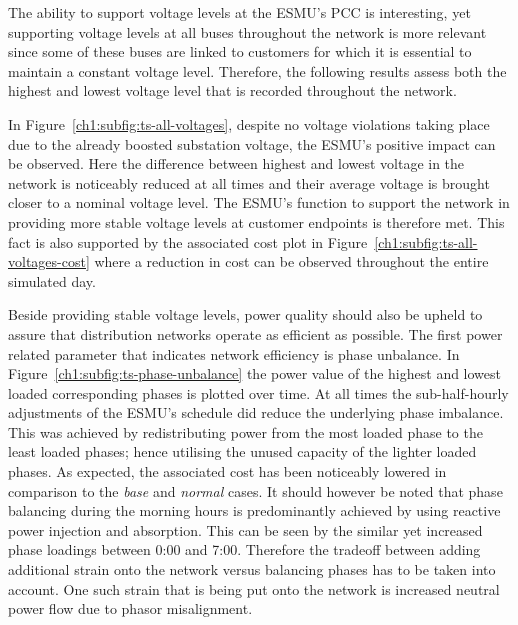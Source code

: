 The ability to support voltage levels at the ESMU's PCC is interesting, yet supporting voltage levels at all buses throughout the network is more relevant since some of these buses are linked to customers for which it is essential to maintain a constant voltage level.
Therefore, the following results assess both the highest and lowest voltage level that is recorded throughout the network.



In Figure~\ref{ch1:subfig:ts-all-voltages}, despite no voltage violations taking place due to the already boosted substation voltage, the ESMU's positive impact can be observed.
Here the difference between highest and lowest voltage in the network is noticeably reduced at all times and their average voltage is brought closer to a nominal voltage level.
The ESMU's function to support the network in providing more stable voltage levels at customer endpoints is therefore met.
This fact is also supported by the associated cost plot in Figure~\ref{ch1:subfig:ts-all-voltages-cost} where a reduction in cost can be observed throughout the entire simulated day.



Beside providing stable voltage levels, power quality should also be upheld to assure that distribution networks operate as efficient as possible.
The first power related parameter that indicates network efficiency is phase unbalance.
In Figure~\ref{ch1:subfig:ts-phase-unbalance} the power value of the highest and lowest loaded corresponding phases is plotted over time.
At all times the sub-half-hourly adjustments of the ESMU's schedule did reduce the underlying phase imbalance.
This was achieved by redistributing power from the most loaded phase to the least loaded phases; hence utilising the unused capacity of the lighter loaded phases.
As expected, the associated cost has been noticeably lowered in comparison to the \textit{base} and \textit{normal} cases.
It should however be noted that phase balancing during the morning hours is predominantly achieved by using reactive power injection and absorption.
This can be seen by the similar yet increased phase loadings between 0:00 and 7:00.
Therefore the tradeoff between adding additional strain onto the network versus balancing phases has to be taken into account.
One such strain that is being put onto the network is increased neutral power flow due to phasor misalignment.



